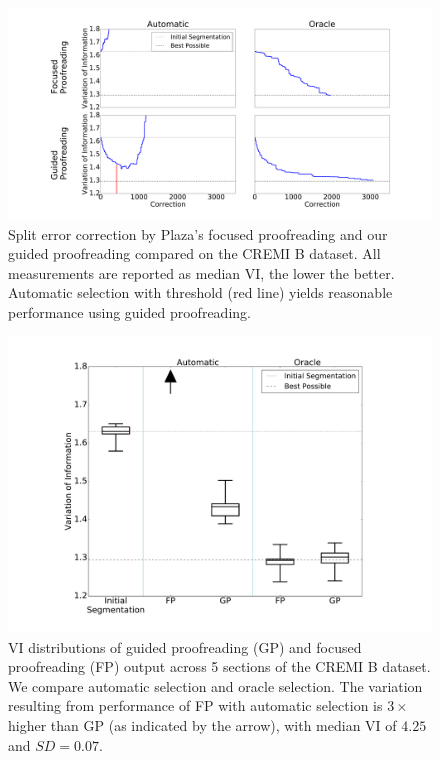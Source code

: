 \begin{figure}[t]
\centering
\includegraphics[width=\linewidth]{gfx/cremiBtrails.pdf}
\caption{Split error correction by Plaza's focused proofreading and our guided proofreading compared on the CREMI B dataset. All measurements are reported as median VI, the lower the better. Automatic selection with threshold (red line) yields reasonable performance using guided proofreading.}
\label{fig:cremiBtrails}
\end{figure}

\begin{figure}[t]
\centering
\includegraphics[width=\linewidth]{gfx/cremiBboxplot.pdf}
\caption{VI distributions of guided proofreading (GP) and focused proofreading (FP) output across 5 sections of the CREMI B dataset. We compare automatic selection and oracle selection. The variation resulting from performance of FP with automatic selection is $3\times$ higher than GP (as indicated by the arrow), with median VI of $4.25$ and $SD=0.07$.}
\label{fig:cremiBboxplot}
\end{figure}

